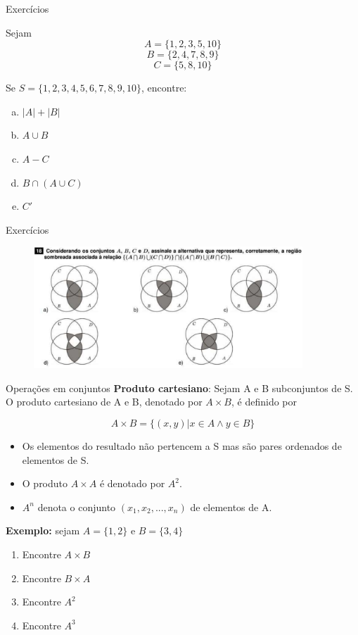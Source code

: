 \documentclass[aspectratio=169]{beamer}
\begin{document}
\begin{frame}{Exercícios}

    Sejam
\[ A = \{1,2,3,5,10\} \]
\[ B = \{2,4,7,8,9\} \]
\[ C = \{5,8,10\} \]

Se $S=\{1,2,3,4,5,6,7,8,9,10\}$, encontre:

\begin{enumerate}[a)]   
    \item $|A| + |B|$
    \item $A \cup B$
    \item $A - C$
    \item $B \cap (A \cup C)$
    \item $C'$
\end{enumerate}
\end{frame}


\begin{frame}{Exercícios}
\begin{figure}
    \includegraphics[width=0.9\textwidth]{./figs/poscomp18-cropped.pdf}
\end{figure}
\end{frame}

\begin{frame}{Operações em conjuntos}
    \textbf{Produto cartesiano}: Sejam A e B subconjuntos de S. O produto cartesiano de A e B, denotado por $A \times B$, é definido por

    \[ A \times B = \{(x, y)|x \in A \wedge y \in B\}\]

    \begin{itemize}
        \item Os elementos do resultado não pertencem a S mas são pares ordenados de elementos de S.
        \item O produto $A \times A$ é denotado por $A^2$.
        \item $A^n$ denota o conjunto $(x_1, x_2, ..., x_n)$ de elementos de
        A.
    \end{itemize}

    \textbf{Exemplo:} sejam $A=\{1,2\}$ e $B=\{3,4\}$

    \begin{multicols}{2}
    \begin{enumerate}
        \item Encontre $A \times B$
        \item Encontre $B \times A$
        \item Encontre $A^2$
        \item Encontre $A^3$
    \end{enumerate}
\end{multicols}

\end{frame}
\end{document}
